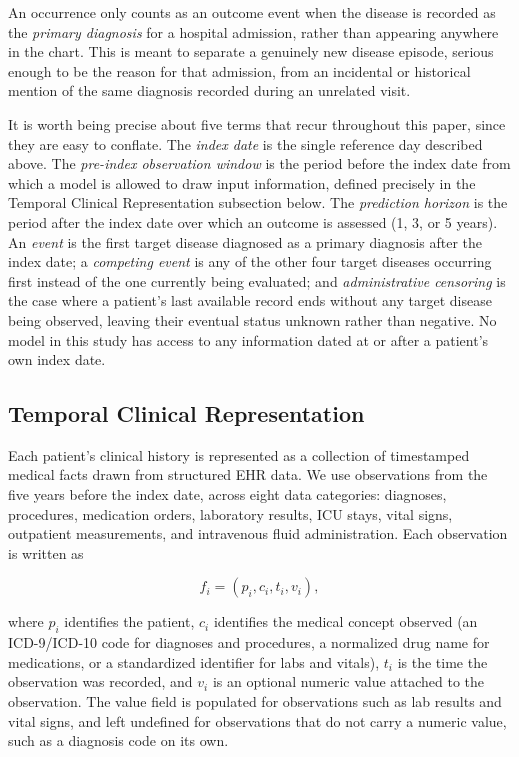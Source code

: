An occurrence only counts as an outcome event when the disease is recorded as the \emph{primary diagnosis} for a hospital admission, rather than appearing anywhere in the chart. This is meant to separate a genuinely new disease episode, serious enough to be the reason for that admission, from an incidental or historical mention of the same diagnosis recorded during an unrelated visit.

It is worth being precise about five terms that recur throughout this paper, since they are easy to conflate. The \emph{index date} is the single reference day described above. The \emph{pre-index observation window} is the period before the index date from which a model is allowed to draw input information, defined precisely in the Temporal Clinical Representation subsection below. The \emph{prediction horizon} is the period after the index date over which an outcome is assessed (1, 3, or 5 years). An \emph{event} is the first target disease diagnosed as a primary diagnosis after the index date; a \emph{competing event} is any of the other four target diseases occurring first instead of the one currently being evaluated; and \emph{administrative censoring} is the case where a patient's last available record ends without any target disease being observed, leaving their eventual status unknown rather than negative. No model in this study has access to any information dated at or after a patient's own index date.

\subsection{Temporal Clinical Representation}
\label{sec:tkg}

Each patient's clinical history is represented as a collection of timestamped medical facts drawn from structured EHR data. We use observations from the five years before the index date, across eight data categories: diagnoses, procedures, medication orders, laboratory results, ICU stays, vital signs, outpatient measurements, and intravenous fluid administration. Each observation is written as

\[
f_i = (p_i, c_i, t_i, v_i),
\]

where $p_i$ identifies the patient, $c_i$ identifies the medical concept observed (an ICD-9/ICD-10 code for diagnoses and procedures, a normalized drug name for medications, or a standardized identifier for labs and vitals), $t_i$ is the time the observation was recorded, and $v_i$ is an optional numeric value attached to the observation. The value field is populated for observations such as lab results and vital signs, and left undefined for observations that do not carry a numeric value, such as a diagnosis code on its own.

